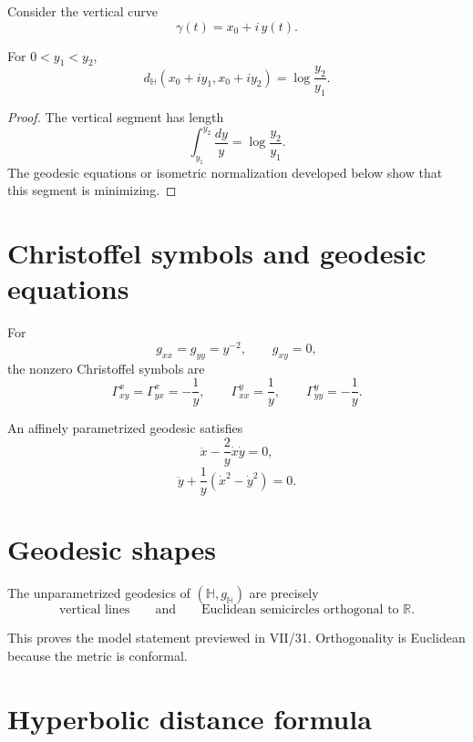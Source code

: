 Consider the vertical curve
\[
\gamma(t)=x_0+i\,y(t).
\]

\begin{proposition}\label{prop:vii32-vertical}
For \(0<y_1<y_2\),
\[
d_{\mathbb H}(x_0+iy_1,x_0+iy_2)
=
\log\frac{y_2}{y_1}.
\]
\end{proposition}

\begin{proof}
The vertical segment has length
\[
\int_{y_1}^{y_2}\frac{dy}{y}
=
\log\frac{y_2}{y_1}.
\]
The geodesic equations or isometric normalization developed below show that this
segment is minimizing.
\end{proof}

\section{Christoffel symbols and geodesic equations}

For
\[
g_{xx}=g_{yy}=y^{-2},
\qquad
g_{xy}=0,
\]
the nonzero Christoffel symbols are
\[
\Gamma^x_{xy}=\Gamma^x_{yx}=-\frac1y,
\qquad
\Gamma^y_{xx}=\frac1y,
\qquad
\Gamma^y_{yy}=-\frac1y.
\]

\begin{proposition}\label{prop:vii32-geodesic-equations}
An affinely parametrized geodesic satisfies
\[
\ddot x-\frac{2}{y}\dot x\dot y=0,
\]
\[
\ddot y+\frac1y(\dot x^2-\dot y^2)=0.
\]
\end{proposition}

\section{Geodesic shapes}

\begin{theorem}\label{thm:vii32-half-geodesics}
The unparametrized geodesics of \((\mathbb H,g_{\mathbb H})\) are precisely
\[
\text{vertical lines}
\qquad\text{and}\qquad
\text{Euclidean semicircles orthogonal to }\mathbb R.
\]
\end{theorem}

\begin{remark}
This proves the model statement previewed in VII/31.  Orthogonality is Euclidean
because the metric is conformal.
\end{remark}

\section{Hyperbolic distance formula}

